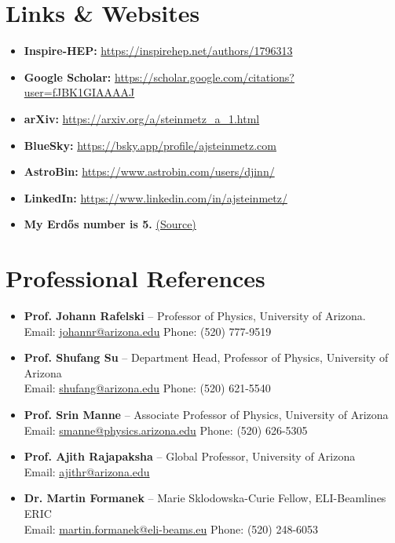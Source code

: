 \documentclass[11pt]{article}
\begin{document}
\section*{Links \& Websites}
\begin{itemize}[leftmargin=*,nosep]
    \item \textbf{Inspire-HEP:} \href{https://inspirehep.net/authors/1796313}{https://inspirehep.net/authors/1796313}
    \item \textbf{Google Scholar:} \href{https://scholar.google.com/citations?user=fJBK1GIAAAAJ}{https://scholar.google.com/citations?user=fJBK1GIAAAAJ}
    \item \textbf{arXiv:} \href{https://arxiv.org/a/steinmetz\_a\_1.html}{https://arxiv.org/a/steinmetz\_a\_1.html}
    \item \textbf{BlueSky:} \href{https://bsky.app/profile/ajsteinmetz.com}{https://bsky.app/profile/ajsteinmetz.com}
    \item \textbf{AstroBin:} \href{https://www.astrobin.com/users/djinn/}{https://www.astrobin.com/users/djinn/}
    \item \textbf{LinkedIn:} \href{https://www.linkedin.com/in/ajsteinmetz/}{https://www.linkedin.com/in/ajsteinmetz/}
    \item \textbf{My Erd\H{o}s number is 5.} \href{https://mathscinet.ams.org/mathscinet/freetools/collab-dist?source=1443426\&target=189017}{(Source)}
\end{itemize}

\section*{Professional References}
{\normalsize
\begin{itemize}[leftmargin=*,nosep,label={\textbullet}]
    \item \textbf{Prof. Johann Rafelski} -- Professor of Physics, University of Arizona.\\
    Email: \href{mailto:johannr@arizona.edu}{johannr@arizona.edu} \quad Phone: (520) 777-9519
    \item \textbf{Prof. Shufang Su} -- Department Head, Professor of Physics, University of Arizona\\
    Email: \href{mailto:shufang@arizona.edu}{shufang@arizona.edu} \quad Phone: (520) 621-5540
    \item \textbf{Prof. Srin Manne} -- Associate Professor of Physics, University of Arizona\\
    Email: \href{mailto:smanne@physics.arizona.edu}{smanne@physics.arizona.edu} \quad Phone: (520) 626-5305
    \item \textbf{Prof. Ajith Rajapaksha} -- Global Professor, University of Arizona\\
    Email: \href{mailto:ajithr@arizona.edu}{ajithr@arizona.edu}
    \item \textbf{Dr. Martin Formanek} -- Marie Sklodowska-Curie Fellow, ELI-Beamlines ERIC\\
    Email: \href{mailto:martin.formanek@eli-beams.eu}{martin.formanek@eli-beams.eu} \quad Phone: (520) 248-6053
\end{itemize}
}
\end{document}
